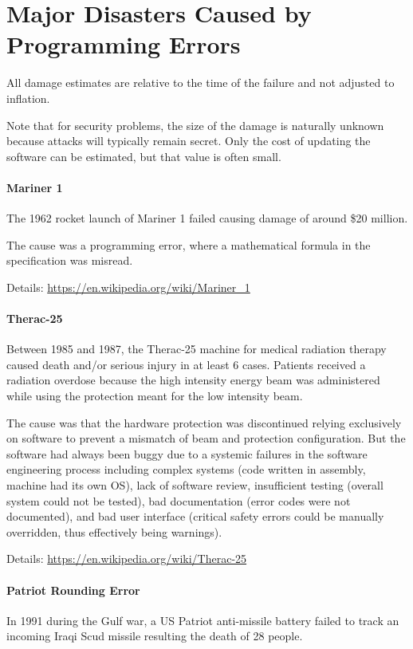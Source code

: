 \section{Major Disasters Caused by Programming Errors}

All damage estimates are relative to the time of the failure and not adjusted to inflation.

Note that for security problems, the size of the damage is naturally unknown because attacks will typically remain secret.
Only the cost of updating the software can be estimated, but that value is often small.

\paragraph{Mariner 1}
The 1962 rocket launch of Mariner 1 failed causing damage of around \$20 million.

The cause was a programming error, where a mathematical formula in the specification was misread.

Details: \url{https://en.wikipedia.org/wiki/Mariner_1}

\paragraph{Therac-25}
Between 1985 and 1987, the Therac-25 machine for medical radiation therapy caused death and/or serious injury in at least $6$ cases.
Patients received a radiation overdose because the high intensity energy beam was administered while using the protection meant for the low intensity beam.

The cause was that the hardware protection was discontinued relying exclusively on software to prevent a mismatch of beam and protection configuration.
But the software had always been buggy due to a systemic failures in the software engineering process including complex systems (code written in assembly, machine had its own OS), lack of software review, insufficient testing (overall system could not be tested), bad documentation (error codes were not documented), and bad user interface (critical safety errors could be manually overridden, thus effectively being warnings).

Details: \url{https://en.wikipedia.org/wiki/Therac-25}

\paragraph{Patriot Rounding Error}
In 1991 during the Gulf war, a US Patriot anti-missile battery failed to track an incoming Iraqi Scud missile resulting the death of 28 people.

